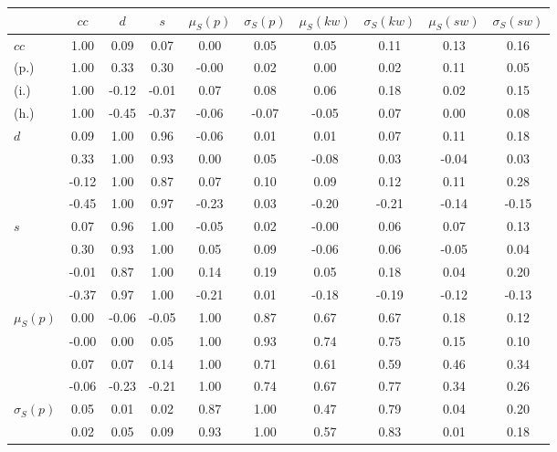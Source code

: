 \begin{table*}[h!]
\begin{center}
\begin{tabular}{| l | c | c | c | c | c | c | c | c | c |}\hline
 & $cc$ & $d$ & $s$ & $\mu_S(p)$ & $\sigma_S(p)$ & $\mu_S(kw)$ & $\sigma_S(kw)$ & $\mu_S(sw)$ & $\sigma_S(sw)$ \\\hline
$cc$ & 1.00  & 0.09  & 0.07  & 0.00  & 0.05  & 0.05  & 0.11  & 0.13  & 0.16 \\\hline
(p.) & 1.00  & 0.33  & 0.30  & -0.00  & 0.02  & 0.00  & 0.02  & 0.11  & 0.05 \\\hline
(i.) & 1.00  & -0.12  & -0.01  & 0.07  & 0.08  & 0.06  & 0.18  & 0.02  & 0.15 \\\hline
(h.) & 1.00  & -0.45  & -0.37  & -0.06  & -0.07  & -0.05  & 0.07  & 0.00  & 0.08 \\\hline
$d$ & 0.09  & 1.00  & 0.96  & -0.06  & 0.01  & 0.01  & 0.07  & 0.11  & 0.18 \\\hline
 & 0.33  & 1.00  & 0.93  & 0.00  & 0.05  & -0.08  & 0.03  & -0.04  & 0.03 \\\hline
 & -0.12  & 1.00  & 0.87  & 0.07  & 0.10  & 0.09  & 0.12  & 0.11  & 0.28 \\\hline
 & -0.45  & 1.00  & 0.97  & -0.23  & 0.03  & -0.20  & -0.21  & -0.14  & -0.15 \\\hline
$s$ & 0.07  & 0.96  & 1.00  & -0.05  & 0.02  & -0.00  & 0.06  & 0.07  & 0.13 \\\hline
 & 0.30  & 0.93  & 1.00  & 0.05  & 0.09  & -0.06  & 0.06  & -0.05  & 0.04 \\\hline
 & -0.01  & 0.87  & 1.00  & 0.14  & 0.19  & 0.05  & 0.18  & 0.04  & 0.20 \\\hline
 & -0.37  & 0.97  & 1.00  & -0.21  & 0.01  & -0.18  & -0.19  & -0.12  & -0.13 \\\hline
$\mu_S(p)$ & 0.00  & -0.06  & -0.05  & 1.00  & 0.87  & 0.67  & 0.67  & 0.18  & 0.12 \\\hline
 & -0.00  & 0.00  & 0.05  & 1.00  & 0.93  & 0.74  & 0.75  & 0.15  & 0.10 \\\hline
 & 0.07  & 0.07  & 0.14  & 1.00  & 0.71  & 0.61  & 0.59  & 0.46  & 0.34 \\\hline
 & -0.06  & -0.23  & -0.21  & 1.00  & 0.74  & 0.67  & 0.77  & 0.34  & 0.26 \\\hline
$\sigma_S(p)$ & 0.05  & 0.01  & 0.02  & 0.87  & 1.00  & 0.47  & 0.79  & 0.04  & 0.20 \\\hline
 & 0.02  & 0.05  & 0.09  & 0.93  & 1.00  & 0.57  & 0.83  & 0.01  & 0.18 \\\hline

\end{tabular}
\end{center}
\end{table*}
